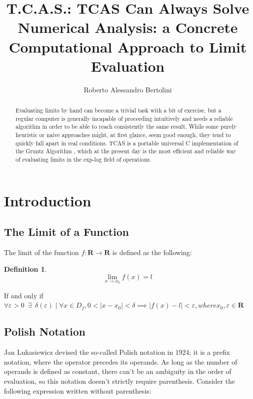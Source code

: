 \documentclass{article}
\title{\textbf{T.C.A.S.}: \textbf{T}CAS \textbf{C}an \textbf{A}lways \textbf{S}olve \\
		\large Numerical Analysis: a Concrete Computational Approach to Limit Evaluation}
\author{Roberto Alessandro Bertolini}
\date{}
\affil{Liceo Nervi Ferrari - Morbegno}
\theoremstyle{plain}
\theoremstyle{definition}
\newtheorem{defn}[thm]{Definition}
\begin{document}
	\maketitle
	
	\begin{abstract}
		Evaluating limits by hand can become a trivial task with a bit of exercise, but a regular computer is generally incapable of proceeding intuitively and needs a reliable algorithm in order to be able to reach consistently the same result. 
		While some purely heuristic or naive approaches might, at first glance, seem good enough, they tend to quickly fall apart in real conditions. TCAS is a portable universal C implementation of the Gruntz Algorithm \cite{gruntz}, which at the present day is the most efficient and reliable way of evaluating limits in the exp-log field of operations.
	\end{abstract}

	\tableofcontents
	
	\newpage	
	
	\section{Introduction}
	
	\subsection{The Limit of a Function}
	
	The limit of the function $ f: \mathbf{R} \rightarrow \mathbf{R} $ is defined as the following:
	
	\begin{defn}
		\[ 
		\lim_{x \to x_{0}}{f(x) = l} 
		 \]
		 
		 If and only if \( 
		 \forall \varepsilon > 0 \enspace \exists \enspace \delta(\varepsilon) \mid \forall x \in D_{f}, 0 < \mid x - x_{0} \mid < \delta \implies \mid f(x) - l \mid < \varepsilon, where x_{0}, \varepsilon \in \mathbf{R}
		  \)
	\end{defn}
	
	\subsection{Polish Notation}
	
	Jan Lukasiewicz devised the so-called Polish notation \cite{wiki:polish} in 1924; it is a prefix notation, where the operator precedes its operands.
	As long as the number of operands is defined as constant, there can't be an ambiguity in the order of evaluation, so this notation doesn't strictly require parenthesis.
	Consider the following expression written without parenthesis:
	
\end{document}
